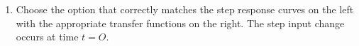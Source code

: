 \documentclass[journal,12pt,onecolumn]{IEEEtran}
\theoremstyle{remark}
\begin{document}
\begin{enumerate}
\begin{figure}[H]
\end{figure}

       At steady state operation, the water inlet flow rate is $q_{ss} = 16 cm^3/s$. The transfer function relating the deviation variables $\tilde{h_2}\brak{cm}$ to flow rate $\tilde{q}\brak{cm^3/s}$ is,
       
\hfill{}
 

\begin{multicols}{4}
    \begin{enumerate}
        \item $\frac{2}{\brak{56s + 1}^{2}}$
        \item $\frac{2}{\brak{62s + 1}^{2}}$
        \item $\frac{2}{\brak{36s + 1}^{2}}$
        \item $\frac{2}{\brak{49s + 1}^{2}}$
    \end{enumerate}
\end{multicols}
\newpage
    \item 
         Choose the option that correctly matches the step response curves on the left with the appropriate transfer functions on the right. The step input change occurs at time $t=O$. 
         

\end{enumerate}
\end{document}
